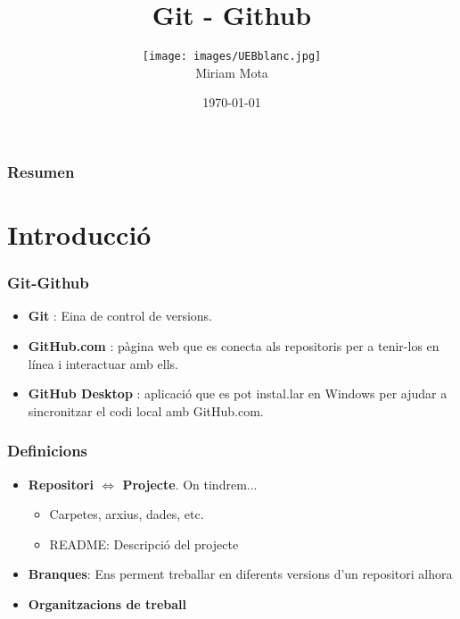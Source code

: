 \documentclass{beamer}
\title[Git-Github]{Git - Github}
\author[Miriam Mota ]{\texttt{[image: images/UEBblanc.jpg]} \\ Miriam Mota} %
\institute%
{
Statistics and Bioinformatics Unit (UEB),\\ 
Vall d'Hebron Research Institute (VHIR) \\ %
\medskip
\textit{miriam.mota@vhir.org}
}
\date{\today} %
\begin{document}
\begin{frame}
\titlepage %
\end{frame}

\begin{frame}
\frametitle{Resumen} %
\small{\tableofcontents} %
\end{frame}


\section{Introducci\'o}


\begin{frame}
	\frametitle{Git-Github}
	\begin{itemize}
		\item \textbf{Git} : Eina de control de versions.
		\item \textbf{GitHub.com} : p\`{a}gina web que es conecta als repositoris per a tenir-los en l\'inea i interactuar amb ells.
		\item \textbf{GitHub Desktop} : aplicaci\'o que es pot instal.lar en Windows per ajudar a sincronitzar el codi local amb GitHub.com.
	\end{itemize}
\end{frame}

\begin{frame}
	\frametitle{Definicions}
	\begin{itemize}
		\item \textbf{Repositori $\Longleftrightarrow$ Projecte}. On tindrem...
		\begin{itemize}
			\item Carpetes, arxius, dades, etc.
			\item README: Descripció del projecte
		\end{itemize}
		\item \textbf{Branques}: Ens perment treballar en diferents versions d'un repositori alhora
		\item \textbf{Organitzacions de treball}
	\end{itemize}
\end{frame}
\end{document}
